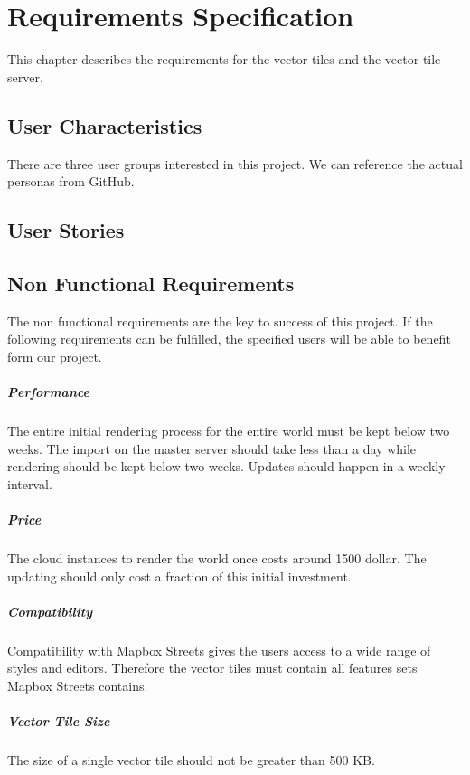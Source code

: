 \chapter{Requirements Specification}\label{requirements_specification}

This chapter describes the requirements for the vector tiles and the vector tile server.

\section{User Characteristics}\label{user_characteristics}

There are three user groups interested in this project.
We can reference the actual personas from GitHub.

\section{User Stories}\label{user_stories}

\section{Non Functional Requirements}\label{non_functional_requirements}

The non functional requirements are the key to success of this project. If the following requirements can be fulfilled, the specified users will be able to benefit form our project.

\paragraph{Performance}

The entire initial rendering process for the entire world must be kept below two weeks. The import on the master server should take less than a day while rendering should be kept below two weeks.
Updates should happen in a weekly interval.

\paragraph{Price}

The cloud instances to render the world once costs around 1500 dollar. The updating should only cost a fraction of this initial investment.

\paragraph{Compatibility}

Compatibility with Mapbox Streets gives the users access
to a wide range of styles and editors. Therefore the vector tiles must contain
all features sets Mapbox Streets contains.

\paragraph{Vector Tile Size}

The size of a single vector tile should not be greater than 500 KB.
